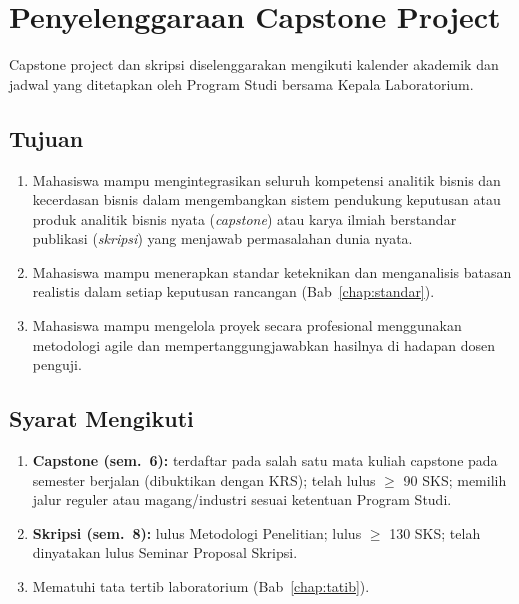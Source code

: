 \documentclass[12pt,a4paper]{report}
\begin{document}
\chapter{Penyelenggaraan Capstone Project}

Capstone project dan skripsi diselenggarakan mengikuti kalender akademik dan jadwal yang ditetapkan oleh Program Studi bersama Kepala Laboratorium.

\section{Tujuan}
\begin{enumerate}
\item Mahasiswa mampu mengintegrasikan seluruh kompetensi analitik bisnis dan kecerdasan bisnis dalam mengembangkan sistem pendukung keputusan atau produk analitik bisnis nyata (\emph{capstone}) atau karya ilmiah berstandar publikasi (\emph{skripsi}) yang menjawab permasalahan dunia nyata.
\item Mahasiswa mampu menerapkan standar keteknikan dan menganalisis batasan realistis dalam setiap keputusan rancangan (Bab~\ref{chap:standar}).
\item Mahasiswa mampu mengelola proyek secara profesional menggunakan metodologi agile dan mempertanggungjawabkan hasilnya di hadapan dosen penguji.
\end{enumerate}

\section{Syarat Mengikuti}
\begin{enumerate}
\item \textbf{Capstone (sem.~6):} terdaftar pada salah satu mata kuliah capstone pada semester berjalan (dibuktikan dengan KRS); telah lulus $\geq$ 90 SKS; memilih jalur reguler atau magang/industri sesuai ketentuan Program Studi.
\item \textbf{Skripsi (sem.~8):} lulus Metodologi Penelitian; lulus $\geq$ 130 SKS; telah dinyatakan lulus Seminar Proposal Skripsi.
\item Mematuhi tata tertib laboratorium (Bab~\ref{chap:tatib}).
\end{enumerate}
\end{document}
